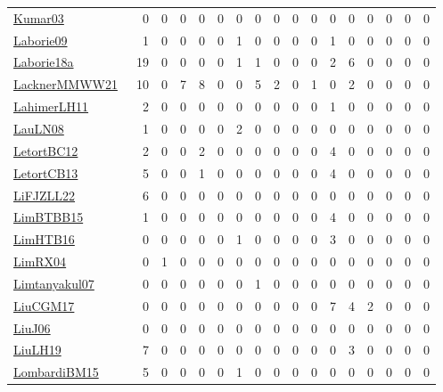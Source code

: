 {\begin{longtable}{l*{16}{r}}
\href{papers/Kumar03.pdf}{Kumar03}~\cite{Kumar03} & 0 & 0 & 0 & 0 & 0 & 0 & 0 & 0 & 0 & 0 & 0 & 0 & 0 & 0 & 0 & 0\\
\href{papers/Laborie09.pdf}{Laborie09}~\cite{Laborie09} & 1 & 0 & 0 & 0 & 0 & 1 & 0 & 0 & 0 & 0 & 1 & 0 & 0 & 0 & 0 & 0\\
\href{papers/Laborie18a.pdf}{Laborie18a}~\cite{Laborie18a} & 19 & 0 & 0 & 0 & 0 & 1 & 1 & 0 & 0 & 0 & 2 & 6 & 0 & 0 & 0 & 0\\
\href{papers/LacknerMMWW21.pdf}{LacknerMMWW21}~\cite{LacknerMMWW21} & 10 & 0 & 7 & 8 & 0 & 0 & 5 & 2 & 0 & 1 & 0 & 2 & 0 & 0 & 0 & 0\\
\href{papers/LahimerLH11.pdf}{LahimerLH11}~\cite{LahimerLH11} & 2 & 0 & 0 & 0 & 0 & 0 & 0 & 0 & 0 & 0 & 1 & 0 & 0 & 0 & 0 & 0\\
\href{papers/LauLN08.pdf}{LauLN08}~\cite{LauLN08} & 1 & 0 & 0 & 0 & 0 & 2 & 0 & 0 & 0 & 0 & 0 & 0 & 0 & 0 & 0 & 0\\
\href{papers/LetortBC12.pdf}{LetortBC12}~\cite{LetortBC12} & 2 & 0 & 0 & 2 & 0 & 0 & 0 & 0 & 0 & 0 & 4 & 0 & 0 & 0 & 0 & 0\\
\href{papers/LetortCB13.pdf}{LetortCB13}~\cite{LetortCB13} & 5 & 0 & 0 & 1 & 0 & 0 & 0 & 0 & 0 & 0 & 4 & 0 & 0 & 0 & 0 & 0\\
\href{papers/LiFJZLL22.pdf}{LiFJZLL22}~\cite{LiFJZLL22} & 6 & 0 & 0 & 0 & 0 & 0 & 0 & 0 & 0 & 0 & 0 & 0 & 0 & 0 & 0 & 0\\
\href{papers/LimBTBB15.pdf}{LimBTBB15}~\cite{LimBTBB15} & 1 & 0 & 0 & 0 & 0 & 0 & 0 & 0 & 0 & 0 & 4 & 0 & 0 & 0 & 0 & 0\\
\href{papers/LimHTB16.pdf}{LimHTB16}~\cite{LimHTB16} & 0 & 0 & 0 & 0 & 0 & 1 & 0 & 0 & 0 & 0 & 3 & 0 & 0 & 0 & 0 & 0\\
\href{papers/LimRX04.pdf}{LimRX04}~\cite{LimRX04} & 0 & 1 & 0 & 0 & 0 & 0 & 0 & 0 & 0 & 0 & 0 & 0 & 0 & 0 & 0 & 0\\
\href{papers/Limtanyakul07.pdf}{Limtanyakul07}~\cite{Limtanyakul07} & 0 & 0 & 0 & 0 & 0 & 0 & 1 & 0 & 0 & 0 & 0 & 0 & 0 & 0 & 0 & 0\\
\href{papers/LiuCGM17.pdf}{LiuCGM17}~\cite{LiuCGM17} & 0 & 0 & 0 & 0 & 0 & 0 & 0 & 0 & 0 & 0 & 7 & 4 & 2 & 0 & 0 & 0\\
\href{papers/LiuJ06.pdf}{LiuJ06}~\cite{LiuJ06} & 0 & 0 & 0 & 0 & 0 & 0 & 0 & 0 & 0 & 0 & 0 & 0 & 0 & 0 & 0 & 0\\
\href{papers/LiuLH19.pdf}{LiuLH19}~\cite{LiuLH19} & 7 & 0 & 0 & 0 & 0 & 0 & 0 & 0 & 0 & 0 & 0 & 3 & 0 & 0 & 0 & 0\\
\href{papers/LombardiBM15.pdf}{LombardiBM15}~\cite{LombardiBM15} & 5 & 0 & 0 & 0 & 0 & 1 & 0 & 0 & 0 & 0 & 0 & 0 & 0 & 0 & 0 & 0\\

\end{longtable}}
